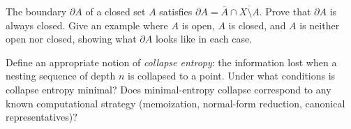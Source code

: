 \begin{exercise}[title={Topological}]
  The boundary $\partial A$ of a closed set $A$ satisfies
  $\partial A = \overline{A} \cap \overline{X \setminus A}$. Prove that
  $\partial A$ is always closed. Give an example where $A$ is open,
  $A$ is closed, and $A$ is neither open nor closed, showing what
  $\partial A$ looks like in each case.
\end{exercise}

\begin{exercise}[title={Open problem}]
  Define an appropriate notion of \emph{collapse entropy}: the information
  lost when a nesting sequence of depth $n$ is collapsed to a point.
  Under what conditions is collapse entropy minimal? Does minimal-entropy
  collapse correspond to any known computational strategy (memoization,
  normal-form reduction, canonical representatives)?
\end{exercise}
